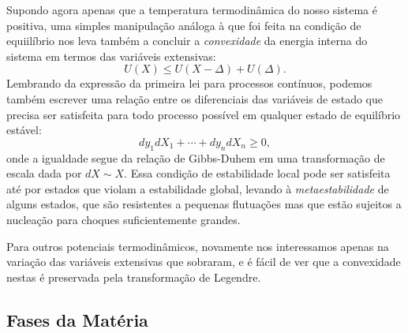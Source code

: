Supondo agora apenas que a temperatura termodinâmica do nosso sistema é
positiva, uma simples manipulação análoga à que foi feita na condição de
equiilíbrio nos leva também a concluir a \emph{convexidade} da energia interna
do sistema em termos das variáveis extensivas:
$$U(X)\leq U(X-\Delta)+U(\Delta).$$
Lembrando da expressão da primeira lei para processos contínuos, podemos também
escrever uma relação entre os diferenciais das variáveis de estado que precisa
ser satisfeita para todo processo possível em qualquer estado de equilíbrio
estável:
$$dy_1dX_1+\cdots+dy_ndX_n\geq0,$$
onde a igualdade segue da relação de Gibbs-Duhem em uma transformação de escala
dada por $dX\sim X$. Essa condição de estabilidade local pode ser satisfeita até
por estados que violam a estabilidade global, levando à \textit{metaestabilidade
} de alguns estados, que são resistentes a pequenas flutuações mas que estão
sujeitos a nucleação para choques suficientemente grandes.

Para outros potenciais termodinâmicos, novamente nos interessamos apenas na
variação das variáveis extensivas que sobraram, e é fácil de ver que a
convexidade nestas é preservada pela transformação de Legendre.

\subsection{Fases da Matéria}

